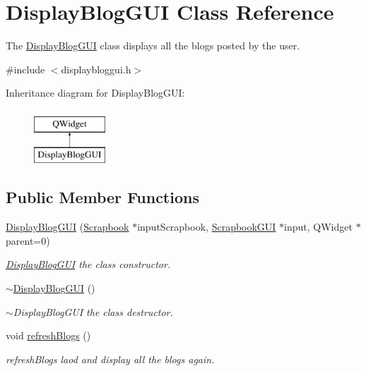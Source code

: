 \hypertarget{classDisplayBlogGUI}{}\section{Display\+Blog\+G\+UI Class Reference}
\label{classDisplayBlogGUI}


The \hyperlink{classDisplayBlogGUI}{Display\+Blog\+G\+UI} class displays all the blogs posted by the user.  




{\ttfamily \#include $<$displaybloggui.\+h$>$}

Inheritance diagram for Display\+Blog\+G\+UI\+:\begin{figure}[H]
\begin{center}
\leavevmode
\includegraphics[height=2.000000cm]{classDisplayBlogGUI}
\end{center}
\end{figure}
\subsection*{Public Member Functions}
\begin{DoxyCompactItemize}
\item 
\hyperlink{classDisplayBlogGUI_acffd793721e3f05feb51e8a185563792}{Display\+Blog\+G\+UI} (\hyperlink{classScrapbook}{Scrapbook} $\ast$input\+Scrapbook, \hyperlink{classScrapbookGUI}{Scrapbook\+G\+UI} $\ast$input, Q\+Widget $\ast$parent=0)
\begin{DoxyCompactList}\small\item\em \hyperlink{classDisplayBlogGUI}{Display\+Blog\+G\+UI} the class constructor. \end{DoxyCompactList}\item 
\hyperlink{classDisplayBlogGUI_a64d791b23fe2add9457d4384b9bfc423}{$\sim$\+Display\+Blog\+G\+UI} ()
\begin{DoxyCompactList}\small\item\em $\sim$\+Display\+Blog\+G\+UI the class destructor. \end{DoxyCompactList}\item 
void \hyperlink{classDisplayBlogGUI_a5cdafb449488b2295718085a2c991b5e}{refresh\+Blogs} ()\hypertarget{classDisplayBlogGUI_a5cdafb449488b2295718085a2c991b5e}{}\label{classDisplayBlogGUI_a5cdafb449488b2295718085a2c991b5e}

\begin{DoxyCompactList}\small\item\em refresh\+Blogs laod and display all the blogs again. \end{DoxyCompactList}\end{DoxyCompactItemize}


